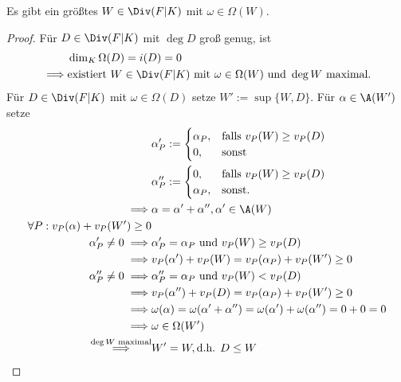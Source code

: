 \begin{lemma}
    Es gibt ein größtes $W \in \Div(F|K)$ mit $\omega\in\Omega(W)$.
\end{lemma}
\begin{proof}
    Für $D \in \Div(F|K)$ mit $\deg D$ groß genug, ist
    \begin{align*}
        & \dim_K \Omega(D) = i(D) = 0\\
        \implies & \text{existiert } W\in\Div(F|K) \text{ mit } \omega \in \Omega(W) \text{ und } \deg W \text{ maximal.}    
    \end{align*}
    Für $D \in \Div(F|K)$ mit $\omega \in \Omega(D)$ setze $W' := \sup\{W,D\}$.
    Für $\alpha \in \A(W')$ setze
    \begin{align*}
        &\alpha_P' := \begin{cases}
            \alpha_P, & \text{falls } v_P(W) \geq v_P(D)\\
            0, & \text{sonst}
        \end{cases}\\
        &\alpha_P'' := \begin{cases}
            0, & \text{falls } v_P(W) \geq v_P(D)\\
            \alpha_P, & \text{sonst}.
        \end{cases}\\
        \implies & \alpha = \alpha' + \alpha'', \alpha' \in \A(W)\\
        \forall P: v_P(\alpha) + v_P(W') \geq 0\\
        \alpha_P' \ne 0 \implies & \alpha_P' = \alpha_P \text{ und } v_P(W) \geq v_P(D)\\
        \implies & v_P(\alpha') + v_P(W) = v_P(\alpha_P) + v_P(W') \geq 0\\
        \alpha_P'' \neq 0 \implies & \alpha_P'' = \alpha_P \text{ und } v_P(W)< v_P(D) \\
        \implies & v_P(\alpha'') + v_P(D) = v_P(\alpha_P) + v_P(W') \geq 0\\
        \implies & \omega(\alpha) = \omega(\alpha' + \alpha'') = \omega(\alpha') + \omega(\alpha'') = 0 + 0 = 0\\
        \implies & \omega \in \Omega(W')\\
        \stackrel{\deg W \text{ maximal}}{\implies}& W' =W, \text{d.h. } D \leq W
    \end{align*}
\end{proof}

